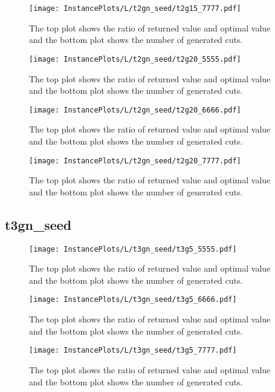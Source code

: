 \documentclass[10pt,a4paper]{article}
\begin{document}
\begin{figure}[H]
\texttt{[image: InstancePlots/L/t2gn\_seed/t2g15\_7777.pdf]}
\caption{The top plot shows the ratio of returned value and optimal value     and the bottom plot shows the number of generated cuts.}
\end{figure}

\begin{figure}[H]
\texttt{[image: InstancePlots/L/t2gn\_seed/t2g20\_5555.pdf]}
\caption{The top plot shows the ratio of returned value and optimal value     and the bottom plot shows the number of generated cuts.}
\end{figure}

\begin{figure}[H]
\texttt{[image: InstancePlots/L/t2gn\_seed/t2g20\_6666.pdf]}
\caption{The top plot shows the ratio of returned value and optimal value     and the bottom plot shows the number of generated cuts.}
\end{figure}

\begin{figure}[H]
\texttt{[image: InstancePlots/L/t2gn\_seed/t2g20\_7777.pdf]}
\caption{The top plot shows the ratio of returned value and optimal value     and the bottom plot shows the number of generated cuts.}
\end{figure}

\subsection{t3gn\_seed}
\begin{figure}[H]
\texttt{[image: InstancePlots/L/t3gn\_seed/t3g5\_5555.pdf]}
\caption{The top plot shows the ratio of returned value and optimal value     and the bottom plot shows the number of generated cuts.}
\end{figure}

\begin{figure}[H]
\texttt{[image: InstancePlots/L/t3gn\_seed/t3g5\_6666.pdf]}
\caption{The top plot shows the ratio of returned value and optimal value     and the bottom plot shows the number of generated cuts.}
\end{figure}

\begin{figure}[H]
\texttt{[image: InstancePlots/L/t3gn\_seed/t3g5\_7777.pdf]}
\caption{The top plot shows the ratio of returned value and optimal value     and the bottom plot shows the number of generated cuts.}
\end{figure}
\end{document}
